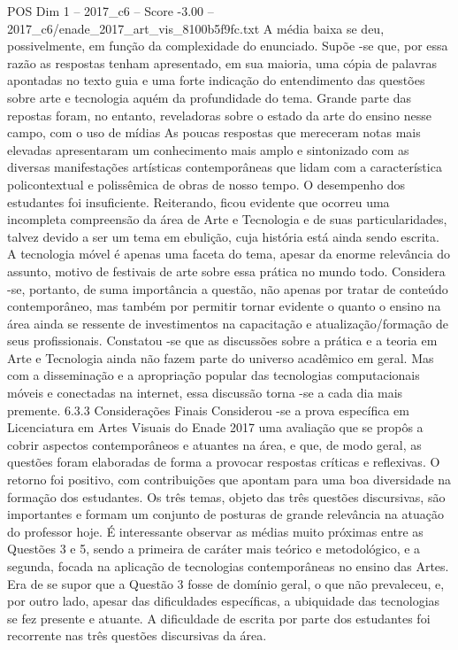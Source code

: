 \begin{textsample}{POS Dim 1 – 2017\_c6 – Score -3.00 – 2017\_c6/enade\_2017\_art\_vis\_8100b5f9fc.txt}
A média baixa se deu, possivelmente, em função da complexidade do enunciado.
Supõe -se que, por essa razão as respostas tenham apresentado, em sua maioria, uma cópia de palavras apontadas no texto guia e uma forte indicação do entendimento das questões sobre arte e tecnologia aquém da profundidade do tema.
Grande parte das repostas foram, no entanto, reveladoras sobre o estado da arte do ensino nesse campo, com o uso de mídias As poucas respostas que mereceram notas mais elevadas apresentaram um conhecimento mais amplo e sintonizado com as diversas manifestações artísticas contemporâneas que lidam com a característica policontextual e polissêmica de obras de nosso tempo.
O desempenho dos estudantes foi insuficiente.
Reiterando, ficou evidente que ocorreu uma incompleta compreensão da área de Arte e Tecnologia e de suas particularidades, talvez devido a ser um tema em ebulição, cuja história está ainda sendo escrita.
A tecnologia móvel é apenas uma faceta do tema, apesar da enorme relevância do assunto, motivo de festivais de arte sobre essa prática no mundo todo.
Considera -se, portanto, de suma importância a questão, não apenas por tratar de conteúdo contemporâneo, mas também por permitir tornar evidente o quanto o ensino na área ainda se ressente de investimentos na capacitação e atualização/formação de seus profissionais.
Constatou -se que as discussões sobre a prática e a teoria em Arte e Tecnologia ainda não fazem parte do universo acadêmico em geral.
Mas com a disseminação e a apropriação popular das tecnologias computacionais móveis e conectadas na internet, essa discussão torna -se a cada dia mais premente. 6.3.3 Considerações Finais Considerou -se a prova específica em Licenciatura em Artes Visuais do Enade 2017 uma avaliação que se propôs a cobrir aspectos contemporâneos e atuantes na área, e que, de modo geral, as questões foram elaboradas de forma a provocar respostas críticas e reflexivas.
O retorno foi positivo, com contribuições que apontam para uma boa diversidade na formação dos estudantes.
Os três temas, objeto das três questões discursivas, são importantes e formam um conjunto de posturas de grande relevância na atuação do professor hoje.
É interessante observar as médias muito próximas entre as Questões 3 e 5, sendo a primeira de caráter mais teórico e metodológico, e a segunda, focada na aplicação de tecnologias contemporâneas no ensino das Artes.
Era de se supor que a Questão 3 fosse de domínio geral, o que não prevaleceu, e, por outro lado, apesar das dificuldades específicas, a ubiquidade das tecnologias se fez presente e atuante.
A dificuldade de escrita por parte dos estudantes foi recorrente nas três questões discursivas da área.

\end{textsample}
